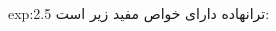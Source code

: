 {\begin{spacing}{1.5}
\begin{example}{exp:2.5}
            ترانهاده دارای خواص مفید زیر است:

            \begin{enumerate}[label=\textbf{\arabic*}.]
            \end{enumerate}
        \end{example}
    \end{spacing}
}


